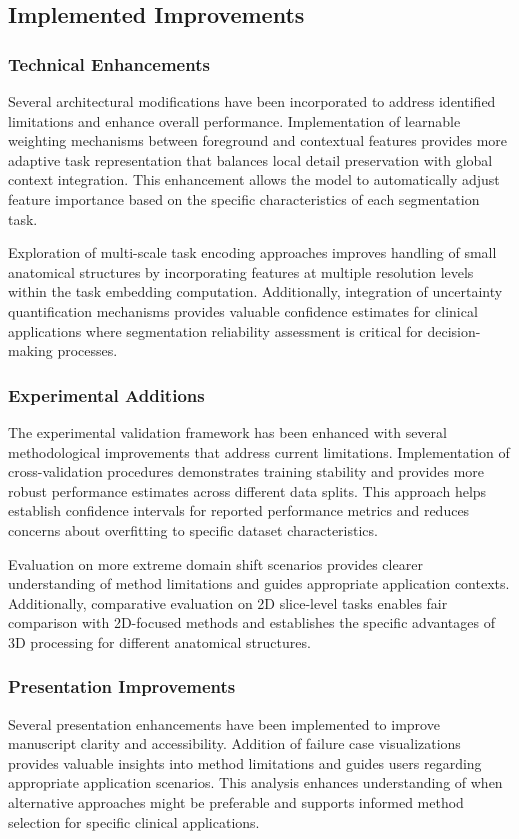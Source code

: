 \subsection{Implemented Improvements}
\subsubsection{Technical Enhancements}
Several architectural modifications have been incorporated to address identified limitations and enhance overall performance. Implementation of learnable weighting mechanisms between foreground and contextual features provides more adaptive task representation that balances local detail preservation with global context integration. This enhancement allows the model to automatically adjust feature importance based on the specific characteristics of each segmentation task.

Exploration of multi-scale task encoding approaches improves handling of small anatomical structures by incorporating features at multiple resolution levels within the task embedding computation. Additionally, integration of uncertainty quantification mechanisms provides valuable confidence estimates for clinical applications where segmentation reliability assessment is critical for decision-making processes.

\subsubsection{Experimental Additions}
The experimental validation framework has been enhanced with several methodological improvements that address current limitations. Implementation of cross-validation procedures demonstrates training stability and provides more robust performance estimates across different data splits. This approach helps establish confidence intervals for reported performance metrics and reduces concerns about overfitting to specific dataset characteristics.

Evaluation on more extreme domain shift scenarios provides clearer understanding of method limitations and guides appropriate application contexts. Additionally, comparative evaluation on 2D slice-level tasks enables fair comparison with 2D-focused methods and establishes the specific advantages of 3D processing for different anatomical structures.

\subsubsection{Presentation Improvements}
Several presentation enhancements have been implemented to improve manuscript clarity and accessibility. Addition of failure case visualizations provides valuable insights into method limitations and guides users regarding appropriate application scenarios. This analysis enhances understanding of when alternative approaches might be preferable and supports informed method selection for specific clinical applications.


